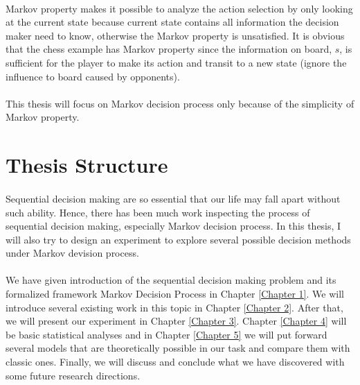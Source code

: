 \paragraph{}
Markov property makes it possible to analyze the action selection by only looking at the current state because current state contains all information the decision maker need to know, otherwise the Markov property is unsatisfied. It is obvious that the chess example has Markov property since the information on board, $s$, is sufficient for the player to make its action and transit to a new state (ignore the influence to board caused by opponents). 
\paragraph{}
This thesis will focus on Markov decision process only because of the simplicity of Markov property. 



\section{Thesis Structure}
\paragraph{}
Sequential decision making are so essential that our life may fall apart without such ability. Hence, there has been much work inspecting the process of sequential decision making, especially Markov decision process. In this thesis, I will also try to design an experiment to explore several possible decision methods under Markov devision process. 
\paragraph{}
We have given introduction of the sequential decision making problem and its formalized framework Markov Decision Process in Chapter \ref{Chapter 1}. We will introduce several existing work in this topic in Chapter \ref{Chapter 2}. After that, we will present our experiment in Chapter \ref{Chapter 3}. Chapter \ref{Chapter 4} will be basic statistical analyses and in Chapter \ref{Chapter 5} we will put forward several models that are theoretically possible in our task and compare them with classic ones. Finally, we will discuss and conclude what we have discovered with some future research directions. 
